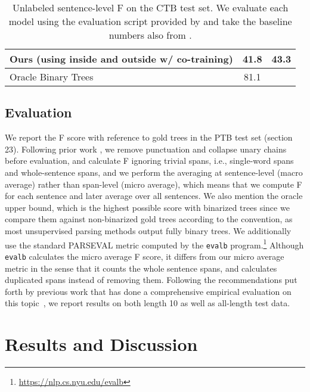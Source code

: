 \documentclass[11pt]{article}
\newcommand{\ptb}{\textsc{PTB}}
\begin{document}
\begin{table}[t]
{\begin{tabular}{lcc}
    \multicolumn{1}{l}{Ours (using inside and outside w/ co-training)} & \cellcolor{pearDark!20}\textbf{41.8} & \cellcolor{pearDark!20}43.3  \\
    \midrule
    \multicolumn{1}{l}{Oracle Binary Trees} & 81.1 & \\
    \bottomrule
    \end{tabular}
    }
    \caption[Results on the CTB test set]{Unlabeled sentence-level F on the CTB test set. We evaluate each model using the evaluation script provided by \citet{kim-etal-2019-compound} and take the baseline numbers also from \citet{kim-etal-2019-compound}.}
    \label{tab:ctb-results}
\end{table} 
\subsection{Evaluation}
\label{ssec:evaluation}
We report the F score with reference to gold trees in the \ptb{} test set (section 23). Following prior work \citep{kim-etal-2019-compound, shen2018neural, shen2018ordered, cao-etal-2020-unsupervised}, we remove punctuation and collapse unary chains before evaluation, and calculate F ignoring trivial spans, i.e., single-word spans and whole-sentence spans, and we perform the averaging at sentence-level (macro average) rather than span-level (micro average), which means that we compute F for each sentence and later average over all sentences. We also mention the oracle upper bound, which is the highest possible score with binarized trees since we compare them against non-binarized gold trees according to the convention, as most unsupervised parsing methods output fully binary trees. We additionally use the standard PARSEVAL metric computed by the \texttt{evalb} program.\footnote{\url{https://nlp.cs.nyu.edu/evalb}} Although \texttt{evalb} calculates the micro average F score, it differs from our micro average metric in the sense that it counts the whole sentence spans, and calculates duplicated spans instead of removing them. Following the recommendations put forth by previous work that has done a comprehensive empirical evaluation on this topic~\citep{li-etal-2020-empirical}, we report results on both length  10 as well as all-length test data.



 \section{Results and Discussion}
\label{sec:results}
\end{document}
